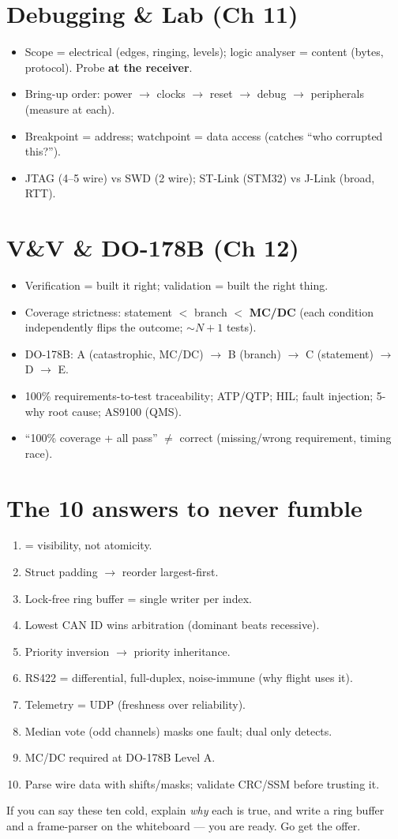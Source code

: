 \section*{Debugging \& Lab (Ch 11)}
\begin{itemize}
\item Scope = electrical (edges, ringing, levels); logic analyser = content
  (bytes, protocol). Probe \textbf{at the receiver}.
\item Bring-up order: power $\rightarrow$ clocks $\rightarrow$ reset
  $\rightarrow$ debug $\rightarrow$ peripherals (measure at each).
\item Breakpoint = address; watchpoint = data access (catches ``who corrupted
  this?'').
\item JTAG (4--5 wire) vs SWD (2 wire); ST-Link (STM32) vs J-Link (broad, RTT).
\end{itemize}

\section*{V\&V \& DO-178B (Ch 12)}
\begin{itemize}
\item Verification = built it right; validation = built the right thing.
\item Coverage strictness: statement $<$ branch $<$ \textbf{MC/DC} (each
  condition independently flips the outcome; $\sim$$N+1$ tests).
\item DO-178B: A (catastrophic, MC/DC) $\rightarrow$ B (branch) $\rightarrow$ C
  (statement) $\rightarrow$ D $\rightarrow$ E.
\item 100\% requirements-to-test traceability; ATP/QTP; HIL; fault injection;
  5-why root cause; AS9100 (QMS).
\item ``100\% coverage + all pass'' $\neq$ correct (missing/wrong requirement,
  timing race).
\end{itemize}

\section*{The 10 answers to never fumble}
\begin{enumerate}
\item {} = visibility, not atomicity.
\item Struct padding $\rightarrow$ reorder largest-first.
\item Lock-free ring buffer = single writer per index.
\item Lowest CAN ID wins arbitration (dominant beats recessive).
\item Priority inversion $\rightarrow$ priority inheritance.
\item RS422 = differential, full-duplex, noise-immune (why flight uses it).
\item Telemetry = UDP (freshness over reliability).
\item Median vote (odd channels) masks one fault; dual only detects.
\item MC/DC required at DO-178B Level A.
\item Parse wire data with shifts/masks; validate CRC/SSM before trusting it.
\end{enumerate}

\begin{keyidea}
If you can say these ten cold, explain \emph{why} each is true, and write a ring
buffer and a frame-parser on the whiteboard --- you are ready. Go get the offer.
\end{keyidea}
